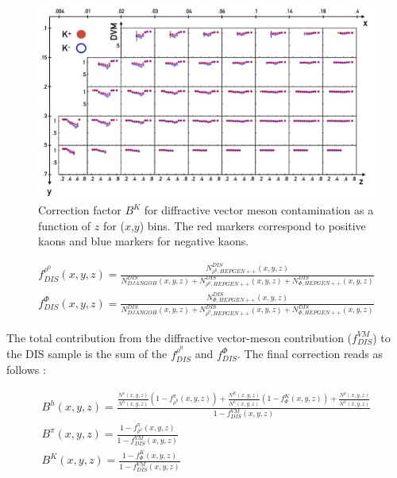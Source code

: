 \documentclass[letterpaper,12pt]{article}
\begin{document}
\begin{figure}
	\includegraphics[scale=0.5]{./gfx/DVMK.png}
	\caption{Correction factor $B^{K}$ for diffractive vector meson contamination as a function of $z$ for ($x$,$y$) bins. The red markers correspond to positive kaons and blue markers for negative kaons.}
	\label{DVMK}
\end{figure}

\begin{equation}
  \begin{split}
    f^{\rho^0}_{DIS}(x,y,z) = \frac{N^{DIS}_{\rho^0,HEPGEN++}(x,y,z)}{N^{DIS}_{DJANGOH}(x,y,z)+N^{DIS}_{\rho^0,HEPGEN++}(x,y,z)+N^{DIS}_{\Phi,HEPGEN++}(x,y,z)} \\
    f^{\Phi}_{DIS}(x,y,z) = \frac{N^{DIS}_{\Phi,HEPGEN++}(x,y,z)}{N^{DIS}_{DJANGOH}(x,y,z)+N^{DIS}_{\rho^0,HEPGEN++}(x,y,z)+N^{DIS}_{\Phi,HEPGEN++}(x,y,z)}
  \end{split}
\end{equation}

The total contribution from the diffractive vector-meson contribution ($f^{VM}_{DIS}$) to the DIS sample is the sum of the $f^{\rho^0}_{DIS}$ and $f^{\Phi}_{DIS}$.
The final correction reads as follows :

\begin{equation}
  \begin{split}
  B^h(x,y,z) = \frac{ \frac{N^{\pi}(x,y,z)}{N^h(x,y,z)}\left (1-f^{\pi}_{\rho^0}(x,y,z)\right )
                   + \frac{N^K(x,y,z)}{N^h(x,y,z)}\left (1-f^{K}_{\Phi}(x,y,z)\right ) + \frac{N^p(x,y,z)}{N^h(x,y,z)} }{1-f^{VM}_{DIS}(x,y,z)} \\
  B^{\pi}(x,y,z) = \frac{1-f^{\pi}_{\rho^0}(x,y,z)}{1-f^{VM}_{DIS}(x,y,z)} \\
  B^K(x,y,z) = \frac{1-f^{K}_{\Phi}(x,y,z)}{1-f^{VM}_{DIS}(x,y,z)}
  \end{split}
\end{equation}
\end{document}
